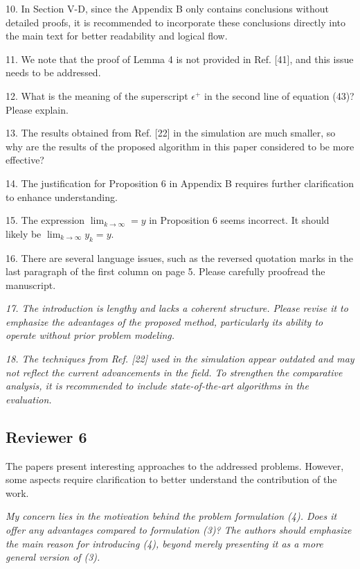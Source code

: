 \documentclass[journal,twoside,web]{ieeecolor}
\begin{document}
10. In Section V-D, since the Appendix B only contains conclusions without detailed proofs, it is recommended to incorporate these conclusions directly into the main text for better readability and logical flow.

11. We note that the proof of Lemma 4 is not provided in Ref. [41], and this issue needs to be addressed.

12. What is the meaning of the superscript $\epsilon^+$ in the second line of equation (43)? Please explain.

13. The results obtained from Ref. [22] in the simulation are much smaller, so why are the results of the proposed algorithm in this paper considered to be more effective?

14. The justification for Proposition 6 in Appendix B requires further clarification to enhance understanding.

15. The expression $\lim_{k \to \infty}=y$ in Proposition 6 seems incorrect. It should likely be $\lim_{k \to \infty} y_k=y$.

16. There are several language issues, such as the reversed quotation marks in the last paragraph of the first column on page 5. Please carefully proofread the manuscript.

\textcolor{reviewerred}{\textit{17. The introduction is lengthy and lacks a coherent structure. Please revise it to emphasize the advantages of the proposed method, particularly its ability to operate without prior problem modeling.}}

\textcolor{reviewerred}{\textit{18. The techniques from Ref. [22] used in the simulation appear outdated and may not reflect the current advancements in the field. To strengthen the comparative analysis, it is recommended to include state-of-the-art algorithms in the evaluation.}}

\subsection*{Reviewer 6}

The papers present interesting approaches to the addressed problems. However, some aspects require clarification to better understand the contribution of the work.

\textcolor{reviewerred}{\textit{My concern lies in the motivation behind the problem formulation (4). Does it offer any advantages compared to formulation (3)? The authors should emphasize the main reason for introducing (4), beyond merely presenting it as a more general version of (3).}}
\end{document}
